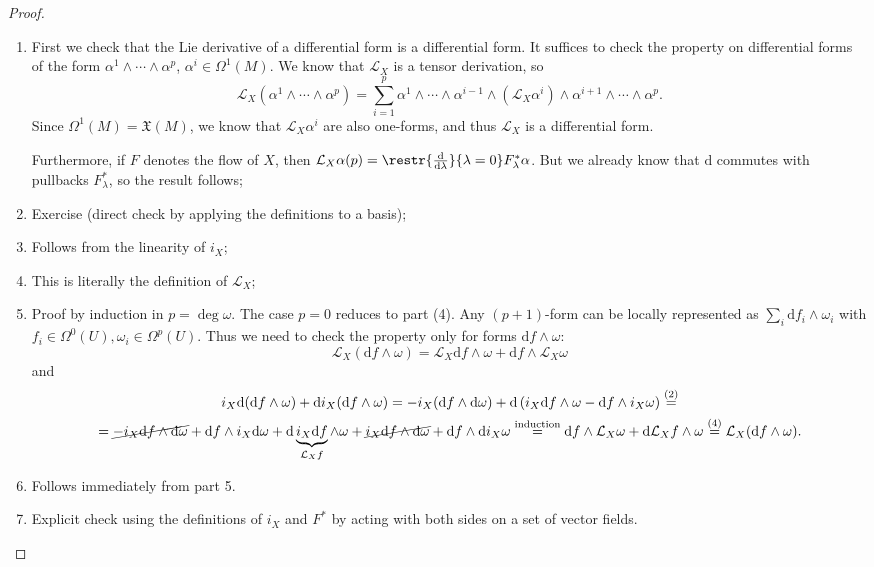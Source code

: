 \documentclass[english,letterpaper]{article}%
\numberwithin{equation}{section}
\numberwithin{figure}{section}
\numberwithin{table}{section}
\theoremstyle{definition}
\theoremstyle{definition}
\theoremstyle{definition}
\theoremstyle{plain}
\theoremstyle{plain}
\theoremstyle{plain}
\theoremstyle{plain}
\theoremstyle{remark}
\theoremstyle{remark}
\newcommand{\dd}{{\mathrm{d}}}
\newcommand{\Lie}{\mathcal{L}}
\newcommand{\fX}{\mathfrak{X}}
\begin{document}
\begin{proof}
\begin{enumerate}
    \item First we check that the Lie derivative of a differential form is a differential form. It suffices to check the property on differential forms of the form $\alpha^1\wedge\cdots\wedge\alpha^p$, $\alpha^i\in\Omega^1(M)$. We know that $\Lie_X$ is a tensor derivation, so 
    \[\Lie_X (\alpha^1\wedge\cdots\wedge\alpha^p)=\sum_{i=1}^p \alpha^1\wedge\cdots\wedge\alpha^{i-1}\wedge(\Lie_X\alpha^i)\wedge\alpha^{i+1}\wedge\cdots\wedge\alpha^p.\]
    Since $\Omega^1(M)=\fX(M)$, we know that $\Lie_X \alpha^i$ are also one-forms, and thus $\Lie_X$ is a differential form.
    
    Furthermore, if $F$ denotes the flow of $X$, then $\Lie_X\alpha (p)=\restr{\frac{\dd}{\dd\lambda}}{\lambda=0}F^\ast_\lambda \alpha$. But we already know that $\dd$ commutes with pullbacks $F^\ast_\lambda$, so the result follows;
    \item Exercise (direct check by applying the definitions to a basis);
    \item Follows from the linearity of $i_X$;
    \item This is literally the definition of $\Lie_X$;
    \item Proof by induction in $p=\deg\omega$. The case $p=0$ reduces to part (4). Any $(p+1)$-form can be locally represented as $\sum_i \dd f_i\wedge \omega_i$ with $f_i\in\Omega^0(U), \omega_i\in \Omega^p(U)$. Thus we need to check the property only for forms $\dd f\wedge \omega$:
    \[\Lie_X(\dd f\wedge\omega)=\Lie_X \dd f\wedge \omega+\dd f\wedge \Lie_X\omega\]
    and 
    \begin{multline}
        i_X\dd (\dd f\wedge \omega)+ \dd i_X (\dd f\wedge\omega)=-i_X(\dd f\wedge\dd \omega)+\dd\left(i_X\dd f\wedge\omega-\dd f\wedge i_X\omega\right)\overset{(2)}{=}\\=\cancel{-i_X\dd f\wedge\dd \omega}+\dd f\wedge i_X\dd\omega +\dd \underbrace{i_X \dd f}_{\Lie_X f}\wedge\omega+\cancel{i_X\dd f\wedge\dd \omega}+\dd f\wedge \dd i_X\omega\overset{\text{induction}}{=}\dd f\wedge \Lie_X\omega +\dd \Lie_X f\wedge \omega\overset{(4)}{=}\Lie_X(\dd f\wedge\omega).
    \end{multline}
    \item Follows immediately from part 5.
    \item Explicit check using the definitions of $i_X$ and $F^\ast$ by acting with both sides on a set of vector fields.
\end{enumerate}
\end{proof}
\end{document}
